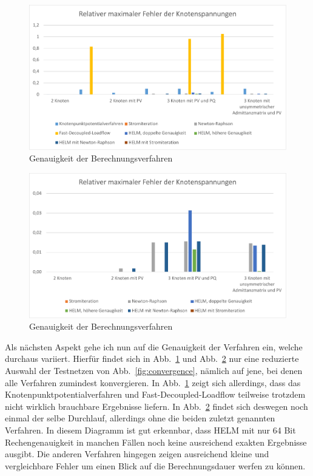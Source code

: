 \documentclass[12pt,a4paper]{article}
\newcommand{\reffig}[1]{{Abb.~\ref{#1}}}
\begin{document}
	\begin{figure}
		\centering
		\includegraphics[scale=0.8]{pictures/precision_1}
		\caption{Genauigkeit der Berechnungsverfahren}
		\label{fig:precision_1}
	\end{figure}
	
	\begin{figure}
		\centering
		\includegraphics[scale=0.8]{pictures/precision_2}
		\caption{Genauigkeit der Berechnungsverfahren}
		\label{fig:precision_2}
	\end{figure}
	
	Als nächsten Aspekt gehe ich nun auf die Genauigkeit der Verfahren ein, welche durchaus variiert. Hierfür findet sich in \reffig{fig:precision_1} und \reffig{fig:precision_2} nur eine reduzierte Auswahl der Testnetzen von \reffig{fig:convergence}, nämlich auf jene, bei denen alle Verfahren zumindest konvergieren. In \reffig{fig:precision_1} zeigt sich allerdings, dass das Knotenpunktpotentialverfahren und Fast-Decoupled-Loadflow teilweise trotzdem nicht wirklich brauchbare Ergebnisse liefern. In \reffig{fig:precision_2} findet sich deswegen noch einmal der selbe Durchlauf, allerdings ohne die beiden zuletzt genannten Verfahren. In diesem Diagramm ist gut erkennbar, dass HELM mit nur 64 Bit Rechengenauigkeit in manchen Fällen noch keine ausreichend exakten Ergebnisse ausgibt. Die anderen Verfahren hingegen zeigen ausreichend kleine und vergleichbare Fehler um einen Blick auf die Berechnungsdauer werfen zu können.
	
\end{document}
